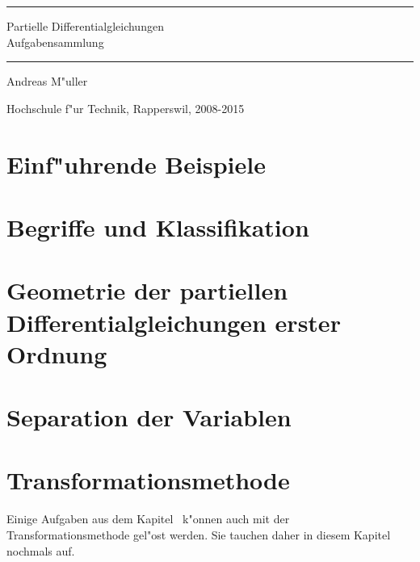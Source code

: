 \documentclass[a4paper,12pt]{book}
\begin{document}
\pagestyle{fancy}
\rhead{}
\frontmatter
\newcommand\HRule{\noindent\rule{\linewidth}{1.5pt}}
\begin{titlepage}
\HRule
\vspace*{2pt}
\begin{flushright}
{\Huge
Partielle Differentialgleichungen\\
\bigskip
Aufgabensammlung}
\end{flushright}
\HRule
\begin{flushright}
\vspace{30pt}
\LARGE
Andreas M"uller
\end{flushright}
\begin{center}
Hochschule f"ur Technik, Rapperswil, 2008-2015
\end{center}
\end{titlepage}
\hypersetup{
	colorlinks=true,
	linktoc=all,
	linkcolor=blue
}
\tableofcontents
\newenvironment{beispiel}[1][Beispiel]{%
\begin{proof}[#1]%
\renewcommand{\qedsymbol}{$\bigcirc$}
}{\end{proof}}
\mainmatter


\chapter{Einf"uhrende  Beispiele}

\chapter{Begriffe und Klassifikation}

\chapter{Geometrie der partiellen Differentialgleichungen erster Ordnung}

\chapter{Separation der Variablen\label{chapter:separation}}

\chapter{Transformationsmethode}
Einige Aufgaben aus dem Kapitel~\label{chapter:separation}
k"onnen auch mit der Transformationsmethode gel"ost werden.
Sie tauchen daher in diesem Kapitel nochmals auf.
\bigskip
\end{document}
